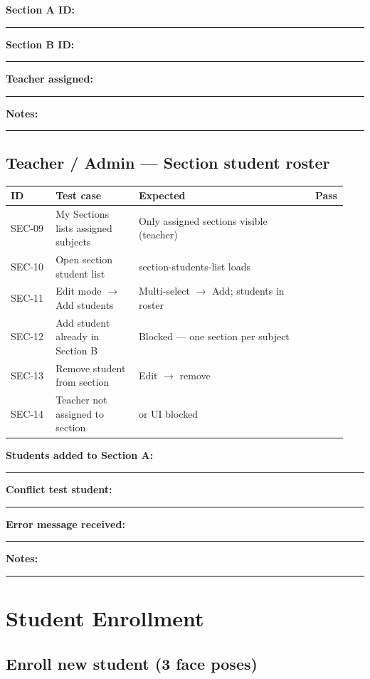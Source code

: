 \documentclass[11pt,a4paper,oneside]{article}
\newcommand{\chk}{\fbox{\rule{0pt}{1.05ex}\rule{1.05ex}{0pt}}}
\newcommand{\fillin}[1][3.5cm]{\rule{#1}{0.4pt}}
\newcommand{\fillinlong}{\rule{0.72\textwidth}{0.4pt}}
\newcommand{\notesblock}{\par\smallskip\noindent\textbf{Notes:}\ \fillinlong\par\smallskip}
\newcommand{\fieldline}[1]{\par\smallskip\noindent\textbf{#1}\ \fillin\par}
\newcommand{\tcheadfour}{%
  \toprule
  \textbf{ID} & \textbf{Test case} & \textbf{Expected} & \textbf{Pass} \\
  \midrule
}
\begin{document}
\fieldline{Section A ID:}
\fieldline{Section B ID:}
\fieldline{Teacher assigned:}
\notesblock

\subsection{Teacher / Admin — Section student roster}

\small
\begin{tabular}{@{}>{\raggedright\arraybackslash}p{0.13\linewidth} >{\raggedright\arraybackslash}p{0.24\linewidth} >{\raggedright\arraybackslash}p{0.51\linewidth} >{\centering\arraybackslash}p{0.06\linewidth}@{}}
  \tcheadfour
  SEC-09 & My Sections lists assigned subjects & Only assigned sections visible (teacher) & \chk \\
  SEC-10 & Open section student list           & section-students-list loads              & \chk \\
  SEC-11 & Edit mode $\rightarrow$ Add students& Multi-select $\rightarrow$ Add; students in roster & \chk \\
  SEC-12 & Add student already in Section B    & Blocked — one section per subject        & \chk \\
  SEC-13 & Remove student from section         & Edit $\rightarrow$ remove                & \chk \\
  SEC-14 & Teacher not assigned to section     & 403 or UI blocked                        & \chk \\
  \bottomrule
\end{tabular}
\normalsize

\fieldline{Students added to Section A:}
\fieldline{Conflict test student:}
\fieldline{Error message received:}
\notesblock

\section{Student Enrollment}

\subsection{Enroll new student (3 face poses)}
\end{document}
